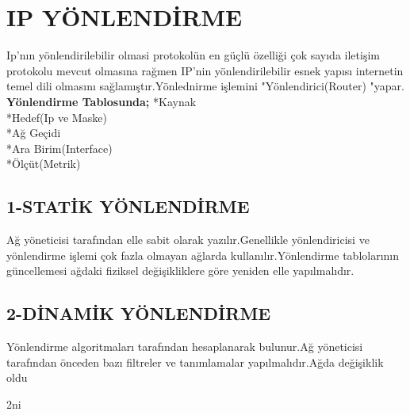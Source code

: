 \section{IP YÖNLENDİRME}

Ip'nın yönlendirilebilir olmasi protokolün  en güçlü özelliği çok sayıda iletişim protokolu mevcut olmasına rağmen IP'nin yönlendirilebilir esnek yapısı internetin temel dili olmasını sağlamıştır.Yönlednirme işlemini "Yönlendirici(Router) "yapar.
\textbf{Yönlendirme Tablosunda;}
*Kaynak \\
*Hedef(Ip ve Maske) \\
*Ağ Geçidi\\
*Ara Birim(Interface)\\
*Ölçüt(Metrik)\\
\subsection{1-STATİK YÖNLENDİRME}
Ağ yöneticisi tarafından elle sabit olarak yazılır.Genellikle yönlendiricisi ve yönlendirme işlemi çok fazla olmayan ağlarda kullanılır.Yönlendirme tablolarının güncellemesi ağdaki fiziksel değişikliklere göre yeniden elle yapılmalıdır.
\subsection{2-DİNAMİK YÖNLENDİRME}
Yönlendirme algoritmaları  tarafından hesaplanarak bulunur.Ağ yöneticisi tarafından önceden bazı filtreler ve tanımlamalar yapılmalıdır.Ağda değişiklik oldu















2ni
